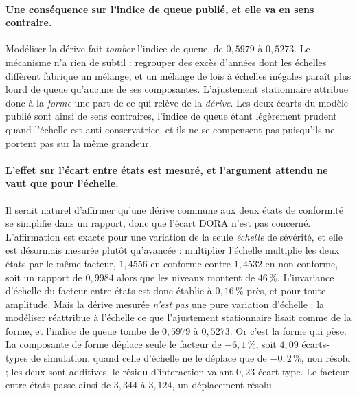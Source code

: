 \paragraph{Une conséquence sur l'indice de queue publié, et elle va en sens contraire.}
Modéliser la dérive fait \emph{tomber} l'indice de queue, de $0{,}5979$ à $0{,}5273$. Le
mécanisme n'a rien de subtil : regrouper des excès d'années dont les échelles diffèrent fabrique
un mélange, et un mélange de lois à échelles inégales paraît plus lourd de queue qu'aucune de ses
composantes. L'ajustement stationnaire attribue donc à la \emph{forme} une part de ce qui relève
de la \emph{dérive}. Les deux écarts du modèle publié sont ainsi de sens contraires, l'indice de
queue étant légèrement prudent quand l'échelle est anti-conservatrice, et ils ne se compensent
pas puisqu'ils ne portent pas sur la même grandeur.

\paragraph{L'effet sur l'écart entre états est mesuré, et l'argument attendu ne vaut que pour
l'échelle.} Il serait naturel d'affirmer qu'une dérive commune aux deux états de conformité se
simplifie dans un rapport, donc que l'écart DORA n'est pas concerné. L'affirmation est exacte
pour une variation de la seule \emph{échelle} de sévérité, et elle est désormais mesurée plutôt
qu'avancée : multiplier l'échelle multiplie les deux états par le même facteur, $1{,}4556$ en
conforme contre $1{,}4532$ en non conforme, soit un rapport de $0{,}9984$ alors que les niveaux
montent de $46\,\%$. L'invariance d'échelle du facteur entre états est donc établie à
$0{,}16\,\%$ près, et pour toute amplitude. Mais la dérive mesurée \emph{n'est pas} une pure
variation d'échelle : la modéliser réattribue à l'échelle ce que l'ajustement stationnaire lisait
comme de la forme, et l'indice de queue tombe de $0{,}5979$ à $0{,}5273$. Or c'est la forme qui
pèse. La composante de forme déplace seule le facteur de $-6{,}1\,\%$, soit $4{,}09$ écarts-types
de simulation, quand celle d'échelle ne le déplace que de $-0{,}2\,\%$, non résolu ; les deux
sont additives, le résidu d'interaction valant $0{,}23$ écart-type. Le facteur entre états passe
ainsi de $3{,}344$ à $3{,}124$, un déplacement résolu.


